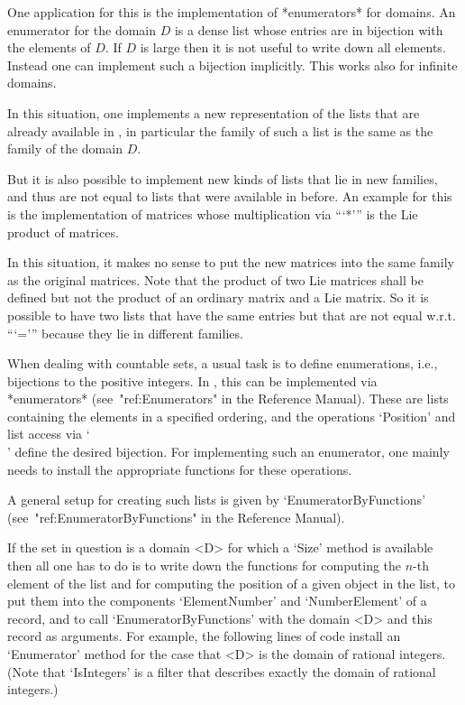 One application for this is the implementation of *enumerators*
for domains.
An enumerator for the domain $D$ is a dense list whose entries are
in bijection with the elements of $D$.
If $D$ is large then it is not useful to write down all elements.
Instead one can implement such a bijection implicitly.
This works also for infinite domains.

In this situation, one implements a new representation of the
lists that are already available in {\GAP},
in particular the family of such a list is the same as the family of
the domain $D$.

But it is also possible to implement new kinds of lists that lie in
new families, and thus are not equal to lists that were available
in {\GAP} before.
An example for this is the implementation of matrices
whose multiplication via ```*''' is the Lie product of matrices.

In this situation, it makes no sense to put the new matrices into the
same family as the original matrices.
Note that the product of two Lie matrices shall be defined but not the
product of an ordinary matrix and a Lie matrix.
So it is possible to have two lists that have the same entries but that
are not equal w.r.t. ```=''' because they lie in different families.



When dealing with countable sets, a usual task is to define enumerations,
i.e., bijections to the positive integers.
In {\GAP}, this can be implemented via *enumerators*
(see~"ref:Enumerators" in the {\GAP} Reference Manual).
These are lists containing the elements in a specified ordering,
and the operations `Position' and list access via `\\[\\]' define the
desired bijection.
For implementing such an enumerator, one mainly needs to install the
appropriate functions for these operations.

A general setup for creating such lists is given by `EnumeratorByFunctions'
(see~"ref:EnumeratorByFunctions" in the {\GAP} Reference Manual).

If the set in question is a domain <D> for which a `Size' method is
available then all one has to do is to write down the functions for
computing the $n$-th element of the list and for computing the position
of a given {\GAP} object in the list, to put them into the components
`ElementNumber' and `NumberElement' of a record, and to call
`EnumeratorByFunctions' with the domain <D> and this record as arguments.
For example, the following lines of code install an `Enumerator' method
for the case that <D> is the domain of rational integers.
(Note that `IsIntegers' is a filter that describes exactly the domain of
rational integers.)

